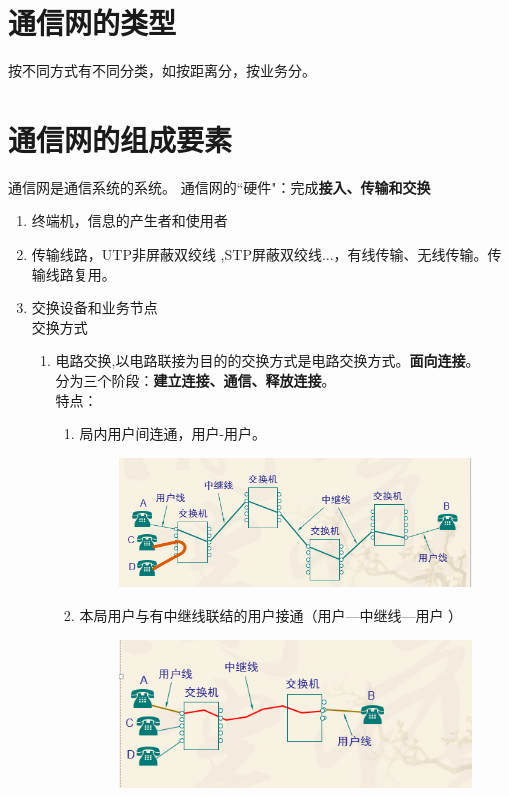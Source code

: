 \section{通信网的类型}
按不同方式有不同分类，如按距离分，按业务分。
\section{通信网的组成要素}
通信网是通信系统的系统。
通信网的“硬件"：完成\textbf{接入、传输和交换}
\begin{enumerate}
	\item 终端机，信息的产生者和使用者
	\item 传输线路，UTP非屏蔽双绞线
	,STP屏蔽双绞线...，有线传输、无线传输。传输线路复用。
	\item 交换设备和业务节点\\
	交换方式
	\begin{enumerate}
		\item 电路交换,以电路联接为目的的交换方式是电路交换方式。\textbf{面向连接}。\\
		分为三个阶段：\textbf{建立连接、通信、释放连接}。\\
		特点：
		\begin{enumerate}
			\item 局内用户间连通，用户-用户。
			\begin{figure}[H]
				\centering
				\includegraphics[width=0.7\linewidth]{figures/screenshot021}
				\caption{}
				\label{fig:screenshot021}
			\end{figure}
			\item 本局用户与有中继线联结的用户接通（用户—中继线—用户 ）
			\begin{figure}[H]
				\centering
				\includegraphics[width=0.7\linewidth]{figures/screenshot022}
				\caption{}

\end{figure}
\end{enumerate}
\end{enumerate}
\end{enumerate}
